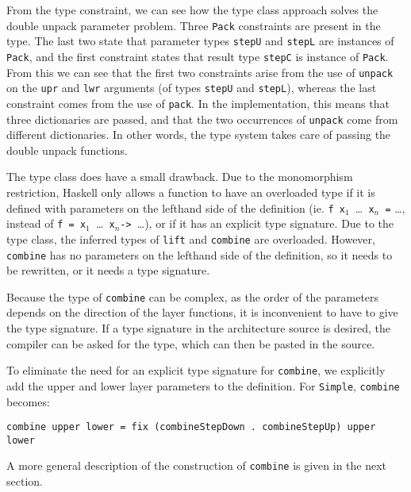 From the type constraint, we can see how the type class approach solves the double unpack parameter problem. Three \texttt{Pack} constraints are present in the type. The last two state that parameter types \texttt{stepU} and \texttt{stepL} are instances of \texttt{Pack}, and the first constraint states that result type \texttt{stepC} is instance of \texttt{Pack}. From this we can see that the first two constraints arise from the use of \texttt{unpack} on the \texttt{upr} and \texttt{lwr} arguments (of types \texttt{stepU} and \texttt{stepL}), whereas the last constraint comes from the use of \texttt{pack}. In the implementation, this means that three dictionaries are passed, and that the two occurrences of \texttt{unpack} come from different dictionaries. In other words, the type system takes care of passing the double unpack functions.

The type class does have a small drawback. Due to the monomorphism restriction, Haskell only allows a function to have an overloaded type if it is defined with parameters on the lefthand side of the definition (ie. \texttt{f x$_1$~}\dots \texttt{~x$_n$ =} \dots, instead of \texttt{f = x$_1$~}\dots \texttt{~x$_n$}\verb|-> |\dots), or if it has an explicit type signature. Due to the type class, the inferred types of \texttt{lift} and \texttt{combine} are overloaded. However, \texttt{combine} has no parameters on the lefthand side of the definition, so it needs to be rewritten, or it needs a type signature.

Because the type of \texttt{combine} can be complex, as the order of the parameters depends on the direction of the layer functions, it is inconvenient to have to give the type signature. If a type signature in the architecture source is desired, the compiler can be asked for the type, which can then be pasted in the source.

To eliminate the need for an explicit type signature for \texttt{combine}, we explicitly add the upper and lower layer parameters to the definition. For \texttt{Simple}, \texttt{combine} becomes: 

\begin{small}
\begin{verbatim}
combine upper lower = fix (combineStepDown . combineStepUp) upper lower
\end{verbatim}
\end{small}

A more general description of the construction of \texttt{combine} is given in the next section.


